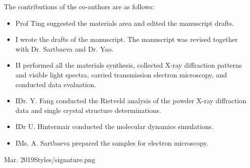 {	The contributions of the co-authors are as follows:
	\begin{itemize}[topsep=1pt,itemsep=1pt,partopsep=1pt, parsep=1pt]
		\item Prof Ting suggested the materials area and edited the manuscript drafts.
		\item I wrote the drafts of the manuscript.  The manuscript was revised together with Dr. Sartbaeva and Dr. Yao.
		\item II performed all the materials synthesis, collected X-ray diffraction patterns and visible light spectra, carried transmission electron microscopy, and conducted data evaluation.
		\item IDr. Y. Fang conducted the Rietveld analysis of the powder X-ray diffraction data and single crystal structure determinations.
		\item IDr U. Hintermair conducted the molecular dynamics simulations.
		\item IMs. A. Sartbaeva prepared the samples for electron microscopy.
	\end{itemize}
}{Mar. 2019}{Styles/signature.png}

